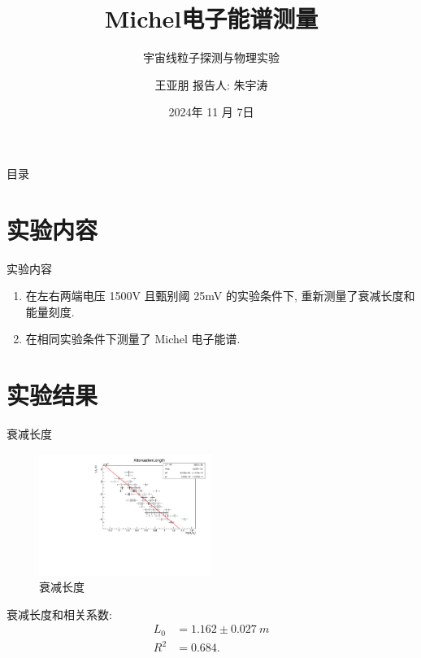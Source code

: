 \documentclass[10pt]{beamer}
\author{王亚朋 \quad 报告人: 朱宇涛}
\date{2024年 11 月 7日}
\title{Michel电子能谱测量}
\subtitle{宇宙线粒子探测与物理实验}
\begin{document}
\maketitle
\begin{frame}[label={sec:org39e6fb4}]{目录}
\tableofcontents
\end{frame}

\section{实验内容}
\label{sec:org61d0955}
\begin{frame}[label={sec:orgf1f30f5}]{实验内容}
\begin{enumerate}
\item 在左右两端电压 1500V 且甄别阈 25mV 的实验条件下, 重新测量了衰减长度和能量刻度.
\item 在相同实验条件下测量了 Michel 电子能谱.
\end{enumerate}
\end{frame}
\section{实验结果}
\label{sec:org2018d95}
\begin{frame}[label={sec:org7acc9f6}]{衰减长度}
\begin{figure}[htbp]
\centering
\includegraphics[width=0.5\textwidth]{../../DetectorPerform/AttenuationLength/figs/ReReAttenuationLength.pdf}
\caption{衰减长度}
\end{figure}

衰减长度和相关系数:
\begin{align*}
L_0 &= 1.162 \pm \qty{0.027}{m} \\
R^2 &= 0.684.
\end{align*}
\end{frame}
\end{document}
